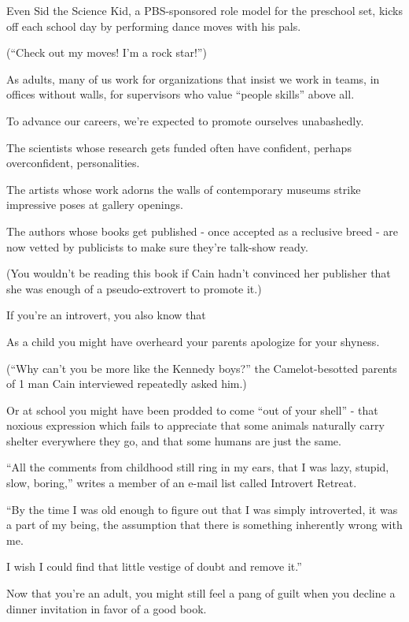 \documentclass[oneside]{article}
\numberwithin{equation}{section}
\begin{document}
Even Sid the Science Kid, a PBS-sponsored role model for the preschool set, kicks off each school day by performing dance moves with his pals.

(``Check out my moves! I'm a rock star!'')

%
As adults, many of us work for organizations that insist we work in teams, in offices without walls, for supervisors who value ``people skills'' above all.

To advance our careers, we're expected to promote ourselves unabashedly.

The scientists whose research gets funded often have confident, perhaps overconfident, personalities.

The artists whose work adorns the walls of contemporary museums strike impressive poses at gallery openings.

The authors whose books get published - once accepted as a reclusive breed - are now vetted by publicists to make sure they're talk-show ready.

(You wouldn't be reading this book if Cain hadn't convinced her publisher that she was enough of a pseudo-extrovert to promote it.)

%
If you're an introvert, you also know that 

As a child you might have overheard your parents apologize for your shyness.

(``Why can't you be more like the Kennedy boys?'' the Camelot-besotted parents of 1 man Cain interviewed repeatedly asked him.)

Or at school you might have been prodded to come ``out of your shell'' - that noxious expression which fails to appreciate that some animals naturally carry shelter everywhere they go, and that some humans are just the same.

``All the comments from childhood still ring in my ears, that I was lazy, stupid, slow, boring,'' writes a member of an e-mail list called Introvert Retreat.

``By the time I was old enough to figure out that I was simply introverted, it was a part of my being, the assumption that there is something inherently wrong with me.

I wish I could find that little vestige of doubt and remove it.''

%
Now that you're an adult, you might still feel a pang of guilt when you decline a dinner invitation in favor of a good book.
\end{document}
